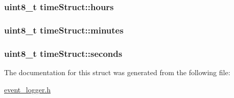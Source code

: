 \subsubsection[{\texorpdfstring{hours}{hours}}]{\setlength{\rightskip}{0pt plus 5cm}uint8\+\_\+t time\+Struct\+::hours}\hypertarget{structtime_struct_a4e47631be91be8c49dce2a1c0d8789f4}{}\label{structtime_struct_a4e47631be91be8c49dce2a1c0d8789f4}
\subsubsection[{\texorpdfstring{minutes}{minutes}}]{\setlength{\rightskip}{0pt plus 5cm}uint8\+\_\+t time\+Struct\+::minutes}\hypertarget{structtime_struct_a5c2cca19ef619fa7a9fcfcfcd46d895a}{}\label{structtime_struct_a5c2cca19ef619fa7a9fcfcfcd46d895a}
\subsubsection[{\texorpdfstring{seconds}{seconds}}]{\setlength{\rightskip}{0pt plus 5cm}uint8\+\_\+t time\+Struct\+::seconds}\hypertarget{structtime_struct_a6b9621b90a9f7f6cae0341d7e7a5be8b}{}\label{structtime_struct_a6b9621b90a9f7f6cae0341d7e7a5be8b}


The documentation for this struct was generated from the following file\+:\begin{DoxyCompactItemize}
\item 
\hyperlink{event__logger_8h}{event\+\_\+logger.\+h}\end{DoxyCompactItemize}
